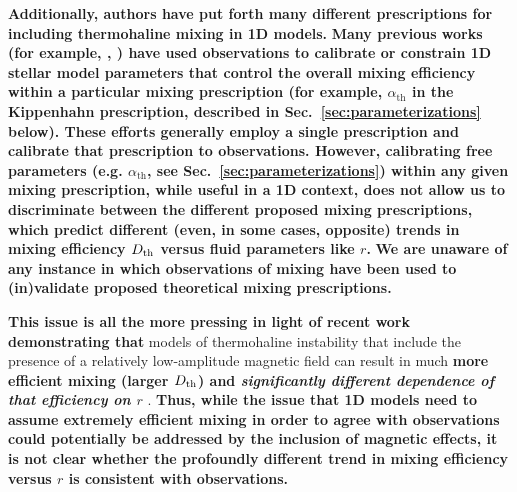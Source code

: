 \textbf{Additionally, authors have put forth many different prescriptions for including thermohaline mixing in 1D models.} %
\textbf{Many previous works (for example, \citealt{CharbonnelLagarde2010}, \citealt{Lagarde2017}) have used observations to calibrate or constrain 1D stellar model parameters that control the overall mixing efficiency within a particular mixing prescription (for example, $\alpha_{\text{th}}$ in the Kippenhahn prescription, described in Sec.~\ref{sec:parameterizations} below).  
These efforts generally employ a single prescription \citep[e.g.~that of][]{kippenhahn_etal_1980} and calibrate that prescription to observations. 
However, calibrating free parameters (e.g. $\alpha_{\text{th}}$, see Sec.~\ref{sec:parameterizations}) within any given mixing prescription, while useful in a 1D context, does not allow us to discriminate between the different proposed mixing prescriptions, which predict different (even, in some cases, opposite) trends in mixing efficiency $D_\mathrm{th}$ versus fluid parameters like $r$.}
\textbf{We are unaware of any instance in which observations of mixing have been used to (in)validate proposed theoretical mixing prescriptions.} 

\textbf{This issue is all the more pressing in light of recent work demonstrating that} models of thermohaline instability that include the presence of a relatively low-amplitude magnetic field can result in much \textbf{more efficient mixing (larger $D_\mathrm{th}$) and \emph{significantly different dependence of that efficiency on $r$}} \citep{harrington}. 
\textbf{Thus, while the issue that 1D models need to assume extremely efficient mixing in order to agree with observations could potentially be addressed by the inclusion of magnetic effects, it is not clear whether the profoundly different trend in mixing efficiency versus $r$ is consistent with observations.}

